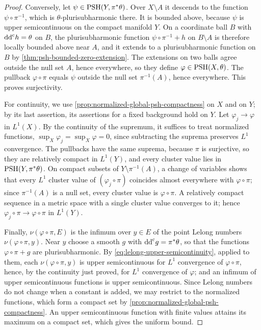 \begin{proof}
Conversely, let $\psi\in\mathrm{PSH}(Y,\pi^*\theta)$. Over $X\setminus A$ it descends to the function $\psi\circ\pi^{-1}$, which is $\theta$-plurisubharmonic there. It is bounded above, because $\psi$ is upper semicontinuous on the compact manifold $Y$. On a coordinate ball $B$ with $\mathrm{dd}^{\mathrm{c}} h=\theta$ on $B$, the plurisubharmonic function $\psi\circ\pi^{-1}+h$ on $B\setminus A$ is therefore locally bounded above near $A$, and it extends to a plurisubharmonic function on $B$ by \cref{thm:psh-bounded-zero-extension}. The extensions on two balls agree outside the null set $A$, hence everywhere, so they define $\varphi\in\mathrm{PSH}(X,\theta)$. The pullback $\varphi\circ\pi$ equals $\psi$ outside the null set $\pi^{-1}(A)$, hence everywhere. This proves surjectivity.

For continuity, we use \cref{prop:normalized-global-psh-compactness} on $X$ and on $Y$; by its last assertion, its assertions for a fixed background hold on $Y$. Let $\varphi_j\to\varphi$ in $L^1(X)$. By the continuity of the supremum, it suffices to treat normalized functions, $\sup_X\varphi_j=\sup_X\varphi=0$, since subtracting the suprema preserves $L^1$ convergence. The pullbacks have the same suprema, because $\pi$ is surjective, so they are relatively compact in $L^1(Y)$, and every cluster value lies in $\mathrm{PSH}(Y,\pi^*\theta)$. On compact subsets of $Y\setminus\pi^{-1}(A)$, a change of variables shows that every $L^1$ cluster value of $(\varphi_j\circ\pi)$ coincides almost everywhere with $\varphi\circ\pi$; since $\pi^{-1}(A)$ is a null set, every cluster value is $\varphi\circ\pi$. A relatively compact sequence in a metric space with a single cluster value converges to it; hence $\varphi_j\circ\pi\to\varphi\circ\pi$ in $L^1(Y)$.

Finally, $\nu(\varphi\circ\pi,E)$ is the infimum over $y\in E$ of the point Lelong numbers $\nu(\varphi\circ\pi,y)$. Near $y$ choose a smooth $g$ with $\mathrm{dd}^{\mathrm{c}} g=\pi^*\theta$, so that the functions $\varphi\circ\pi+g$ are plurisubharmonic. By \eqref{eq:lelong-upper-semicontinuity}, applied to them, each $\nu(\varphi\circ\pi,y)$ is upper semicontinuous for $L^1$ convergence of $\varphi\circ\pi$, hence, by the continuity just proved, for $L^1$ convergence of $\varphi$; and an infimum of upper semicontinuous functions is upper semicontinuous. Since Lelong numbers do not change when a constant is added, we may restrict to the normalized functions, which form a compact set by \cref{prop:normalized-global-psh-compactness}. An upper semicontinuous function with finite values attains its maximum on a compact set, which gives the uniform bound.
\end{proof}

